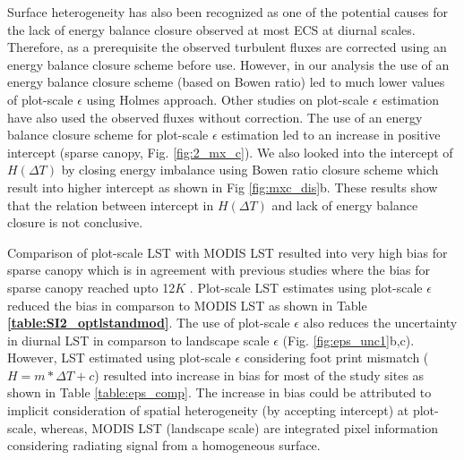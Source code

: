 \documentclass[fleqn,10pt]{wlscirep}
\begin{document}
{%
Surface heterogeneity has also been recognized as one of the potential causes for the lack of energy balance closure observed at most ECS \cite{wilson2002energy, stoy2013data} at diurnal scales. Therefore, as a prerequisite the observed turbulent fluxes are corrected using an energy balance closure scheme \cite{foken2008energy} before use. However, in our analysis the use of an energy balance closure scheme (based on Bowen ratio) led to much lower values of plot-scale $\epsilon$ using Holmes approach. Other studies on plot-scale $\epsilon$ estimation have also used the observed fluxes without correction\cite{chen2003surface, holmes_land_2009-1,juang2007separating,maes2019potential}. The use of  an energy balance closure scheme for plot-scale $\epsilon$ estimation led to an increase in positive intercept (sparse canopy, Fig. \ref{fig:2_mx_c}). We also looked into the intercept of $H(\Delta T)$ by closing energy imbalance using Bowen ratio closure scheme \cite{foken2008energy} which result into higher intercept as shown in Fig \ref{fig:mxc_dis}b. These results show that the relation between intercept in $H(\Delta T)$ and lack of energy balance closure is not conclusive.

Comparison of plot-scale LST with MODIS LST resulted into very high bias for sparse canopy which is in agreement with previous studies where the bias for sparse canopy reached upto 12$K$ \cite{guillevic2018land}. Plot-scale LST estimates using plot-scale $\epsilon$ reduced the bias in comparson to MODIS LST as shown in Table \textbf{\ref{table:SI2_optlstandmod}}. The use of plot-scale $\epsilon$ also reduces the uncertainty in diurnal LST in comparson to  landscape scale $\epsilon$ (Fig. \ref{fig:eps_unc1}b,c). However, LST estimated using plot-scale $\epsilon$ considering  foot print mismatch ($H=m*\Delta T +c$) resulted into increase in bias for most of the study sites as shown in Table \ref{table:eps_comp}. The increase in bias could be attributed to implicit consideration of spatial heterogeneity (by accepting intercept) at plot-scale, whereas, MODIS LST (landscape scale) are integrated pixel information considering radiating signal from a homogeneous surface.

}
\end{document}
